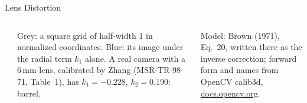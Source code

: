 \begin{frame}{Lens Distortion}
\begin{columns}[T,onlytextwidth]
\\[0.4em]
      {\scriptsize Grey: a square grid of half-width 1 in normalized coordinates. Blue: its image under the radial term $k_1$ alone. A real camera with a 6\,mm lens, calibrated by Zhang (MSR-TR-98-71, Table~1), has $k_1=-0.228$, $k_2=0.190$: barrel.\par}\vspace{0.3em}
      {\scriptsize Model: Brown (1971), Eq.~20, written there as the inverse correction; forward form and names from OpenCV calib3d, \href{https://docs.opencv.org/4.x/d9/d0c/group__calib3d.html}{docs.opencv.org}.\par}
  \end{columns}
\end{frame}

